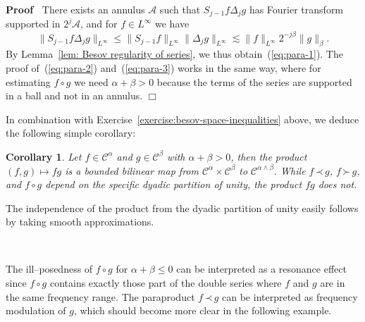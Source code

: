 \documentclass[a4paper,11pt]{article}
\newenvironment{proof}{\noindent\textbf{Proof\ }}{\hspace*{\fill}$\Box$\medskip}
\newtheorem{corollary}{Corollary}
\newcommand{\CA}{\mathscr{A}}
\newcommand{\CC}{\mathscr{C}}
\newcommand{\lpara}{\,\mathord{\prec}\,}
\newcommand{\rpara}{\,\mathord{\succ}\,}
\newcommand{\reso}{\,\mathord{\circ}\,}
\begin{document}
\begin{proof}
  There exists an annulus $\CA$ such that $S_{j - 1} f \Delta_j g$ has Fourier
  transform supported in $2^j \CA$, and for $f \in L^{\infty}$ we have
  \[ \|S_{j - 1} f \Delta_j g\|_{L^{\infty}} \leqslant \|S_{j - 1}
     f\|_{L^{\infty}}  \| \Delta_j g\|_{L^{\infty}} \lesssim
     \|f\|_{L^{\infty}} 2^{- j \beta} \|g\|_{\beta} . \]
  By Lemma~\ref{lem: Besov regularity of series}, we thus
  obtain~(\ref{eq:para-1}). The proof of~(\ref{eq:para-2})
  and~(\ref{eq:para-3}) works in the same way, where for estimating $f \reso
  g$ we need $\alpha + \beta > 0$ because the terms of the series are
  supported in a ball and not in an annulus.
\end{proof}

In combination with Exercise~\ref{exercise:besov-space-inequalities} above, we deduce the following simple corollary:

\begin{corollary}
  \label{cor:product}Let $f \in \CC^{\alpha}$ and $g \in \CC^{\beta}$ with
  $\alpha + \beta > 0$, then the product $(f, g) \mapsto fg$ is a bounded
  bilinear map from $\CC^{\alpha} \times \CC^{\beta}$ to $\CC^{\alpha \wedge
  \beta}$. While $f \lpara g$, $f \rpara g$, and $f \reso g$ depend on the
  specific dyadic partition of unity, the product $f g$ does not.
\end{corollary}

The independence of the product from the dyadic partition of unity easily
follows by taking smooth approximations.

\

The ill--posedness of $f \reso g$ for $\alpha + \beta \leqslant 0$ can be
interpreted as a resonance effect since $f \reso g$ contains exactly those
part of the double series where $f$ and $g$ are in the same frequency range.
The paraproduct $f \lpara g$ can be interpreted as frequency modulation of $g$,
which should become more clear in the following example.
\end{document}
